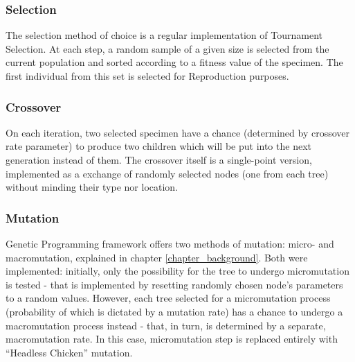\subsubsection{Selection}
The selection method of choice is a regular implementation of Tournament Selection. At each step, a random sample of a given size is selected from the current population and sorted according to a fitness value of the specimen. The first individual from this set is selected for Reproduction purposes.
\subsubsection{Crossover}
On each iteration, two selected specimen have a chance (determined by crossover rate parameter) to produce two children which will be put into the next generation instead of them. The crossover itself is a single-point version, implemented as a exchange of randomly selected nodes (one from each tree) without minding their type nor location.
\subsubsection{Mutation}
Genetic Programming framework offers two methods of mutation: micro- and macromutation, explained in chapter \ref{chapter_background}. Both were implemented: initially, only the possibility for the tree to undergo micromutation is tested - that is implemented by resetting randomly chosen node's parameters to a random values. However, each tree selected for a micromutation process (probability of which is dictated by a mutation rate) has a chance to undergo a macromutation process instead - that, in turn, is determined by a separate, macromutation rate. In this case, micromutation step is replaced entirely with ``Headless Chicken'' mutation.
